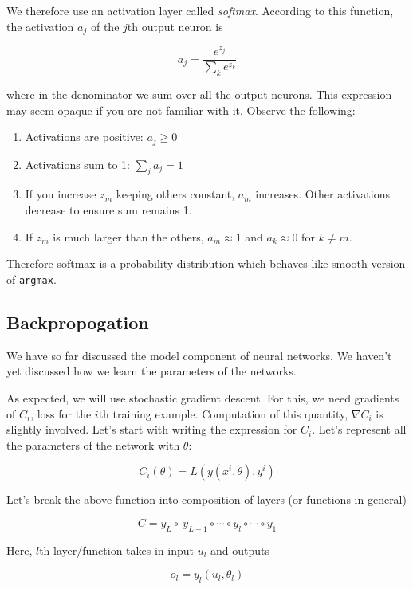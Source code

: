 \documentclass[a4paper]{tufte-handout}
\begin{document}
We therefore use an activation layer called \emph{softmax}. According to
this function, the activation \(a_j\) of the \(j\)th output neuron is

\[ a_j = \frac{e^{z_j}}{\sum_k e^{z_k}} \]

where in the denominator we sum over all the output neurons.
This expression may seem opaque if you are not familiar with it. Observe
the following:

\begin{enumerate}
\item
  Activations are positive: \(a_j \geq 0\)
\item
  Activations sum to 1: \(\sum_j a_j = 1\)
\item
  If you increase \(z_m\) keeping others constant, \(a_m\) increases.
  Other activations decrease to ensure sum remains 1.
\item
  If \(z_m\) is much larger than the others, \(a_m \approx 1\) and
  \(a_k \approx 0\) for \(k \neq m\).
\end{enumerate}

Therefore softmax is a probability distribution which behaves like
smooth version of \texttt{argmax}.

\subsection{Backpropogation}\label{backpropogation}

We have so far discussed the model component of neural networks. We
haven't yet discussed how we learn the parameters of the networks.

As expected, we will use stochastic gradient descent. For this, we need
gradients of \(C_i\), loss for the \(i\)th training example. Computation
of this quantity, \(\nabla C_i\) is slightly involved. Let's start with
writing the expression for \(C_i\). Let's represent all the parameters
of the network with \(\theta\):

\[ C_i(\theta) = L\left(y(x^i, \theta), y^i \right)\]

Let's break the above function into composition of layers (or functions
in general)


\[ C = y_L \circ \ y_{L-1} \circ \cdots \circ y_l \circ \cdots \circ y_1 \]

Here, \(l\)th  layer/function takes in input
\(u_l\) and outputs

\begin{equation}
o_l = y_l(u_l, \theta_l) \label{eq:1}
\end{equation}
\end{document}
